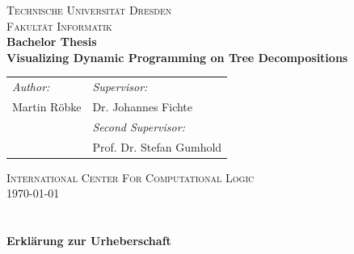 \documentclass[a4paper, 12pt, bibliography=totoc]{scrartcl}
\begin{document}
\def\myauthor{Martin Röbke} 
\def\mycoauthor{Dr. Johannes Fichte} 
\def\mytitle{Visualizing Dynamic Programming on Tree Decompositions} 
\def\mydate{\today} 
\def\mymatriculation{3949819}
\def\mybirthday{04.03.1995}
\def\myemail{Martin.Roebke@tu-dresden.de}

\begin{titlepage}
	\begin{center}
		\textsc{\large 
		{Technische Universität Dresden \\
			Fakultät Informatik} \\
		[8ex]}             
		{\Large\bfseries Bachelor Thesis}           \\[12ex]
		
		{\huge\bfseries \mytitle}                  \\[6.5ex]
		
		\vspace{12ex}
			
		
		{\Large 
		\begin{tabular}{p{}l}
		
			\textit{Author:}&  \textit{Supervisor:}\\
			
			\myauthor &  Dr. Johannes Fichte\\
			
			& \textit{Second Supervisor:}\\
			&  Prof. Dr. Stefan Gumhold\\[20ex]
		
		\end{tabular}
		}
		
		
		\vfill
		\textsc{International Center For Computational Logic 		\\[4ex]}
		\mydate
	\end{center}
\end{titlepage}
\newpage
\section*{ }
\thispagestyle{empty}
{\huge\bfseries{Erklärung zur Urheberschaft}\vspace{20pt}}
\end{document}
